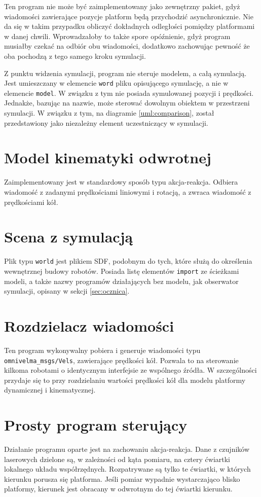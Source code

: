 	Ten program nie może być zaimplementowany jako zewnętrzny pakiet, gdyż wiadomości zawierające pozycje platform będą przychodzić asynchronicznie.
	Nie da się w takim przypadku obliczyć dokładnych odległości pomiędzy platformami w danej chwili. 
	Wprowadzałoby to także spore opóźnienie, gdyż program musiałby czekać na odbiór obu wiadomości, dodatkowo zachowując pewność że oba pochodzą z tego samego kroku symulacji.
	
	Z punktu widzenia symulacji, program nie steruje modelem, a całą symulacją. Jest umieszczany w elemencie \texttt{word} pliku opisującego symulację,
	a nie w elemencie \texttt{model}. W związku z tym nie posiada symulowanej pozycji i prędkości. 
	Jednakże, bazując na nazwie, może sterować dowolnym obiektem w przestrzeni symulacji.
	W związku z tym, na diagramie \ref{uml:comparison}, został przedstawiony jako niezależny element uczestniczący w symulacji.
	
\section{Model kinematyki odwrotnej}
	Zaimplementowany jest w standardowy sposób typu akcja-reakcja.
	Odbiera wiadomość z zadanymi prędkościami liniowymi i rotacją, a zwraca wiadomość z prędkościami kół.
	
\section{Scena z symulacją}
	Plik typu \texttt{world} jest plikiem SDF, podobnym do tych, które służą do określenia wewnętrznej budowy robotów.
	Posiada listę elementów \texttt{import} ze ścieżkami modeli, a także nazwy programów działających bez modelu, jak obserwator symulacji, opisany w sekcji \ref{sec:ocznica}.

\section{Rozdzielacz wiadomości}
	Ten program wykonywalny pobiera i generuje wiadomości typu \texttt{omnivelma\_msgs/Vels}, zawierające prędkości kół.
	Pozwala to na sterowanie kilkoma robotami o identycznym interfejsie ze wspólnego źródła.
	W szczególności przydaje się to przy rozdzielaniu wartości prędkości kół dla modelu platformy dynamicznej i kinematycznej.

\section{Prosty program sterujący}
	Działanie programu oparte jest na zachowaniu akcja-reakcja.
	Dane z czujników laserowych dzielone są, w zależności od kąta pomiaru, na cztery ćwiartki lokalnego układu współrzędnych.
	Rozpatrywane są tylko te ćwiartki, w których kierunku porusza się platforma.
	Jeśli pomiar wypadnie wystarczająco blisko platformy, kierunek jest obracany w odwrotnym do tej ćwiartki kierunku.
	
